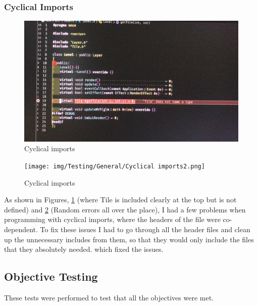 \documentclass[../Main.tex]{subfiles}
\begin{document}
        \clearpage
        \subsubsection{Cyclical Imports}
            \begin{figure}[hbt!]
                \centerline{\includegraphics[scale=0.09]{img/Testing/General/Cyclical imports.jpg}}
                \caption{Cyclical imports}
                \label{fig:CyclicalImports1}
            \end{figure}
            \begin{figure}[hbt!]
                \centerline{\texttt{[image: img/Testing/General/Cyclical imports2.png]}}
                \caption{Cyclical imports}
                \label{fig:CyclicalImports2}
            \end{figure}

            As shown in Figures, \ref{fig:CyclicalImports1} (where Tile is included clearly at the top but is not defined) and \ref{fig:CyclicalImports2} (Random errors all over the place), I had a few problems when programming with cyclical imports, where the headers of the file were co-dependent. To fix these issues I had to go through all the header files and clean up the unnecessary includes from them, so that they would only include the files that they absolutely needed. which fixed the issues.
    \clearpage
    \subsection{Objective Testing}
        These tests were performed to test that all the objectives were met.
\end{document}
